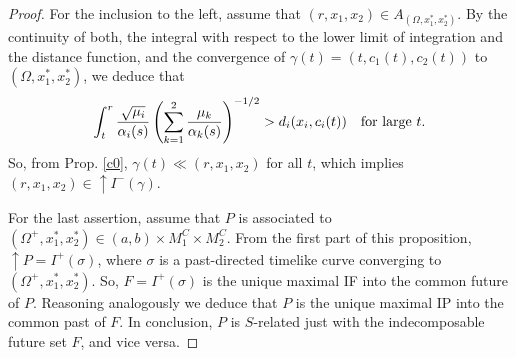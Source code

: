 \begin{proof}
\smallskip

 For the inclusion to the left, assume that $(r,x_1,x_2) \in A_{(\Omega,x_1^*,x_2^*)}$. By the continuity of both, the integral with respect to the lower limit of integration and the distance function, and the convergence of $\gamma(t)=(t,c_1(t),c_2(t))$ to
$(\Omega,x_1^{*},x_2^*)$, we deduce that
\[
\int_{t}^{r}\frac{\sqrt{\mu_{i}}}{\alpha_i(s)}\left(\sum_{k=1}^2\frac{\mu_k}{\alpha_k(s)}\right)^{-1/2} > d_{i}(x_{i},c_{i}(t))\quad\hbox{for large $t$.}
\]
So, from Prop. \ref{c0}, $\gamma(t) \ll  (r,x_1,x_2)$ for  all $t$, which implies $(r,x_1,x_2) \in \uparrow I^{-}(\gamma)$.

\smallskip

For the last assertion, assume that $P$ is associated to $(\Omega^+,x^*_1,x^*_2)\in (a,b)\times M_1^C\times M_2^C$. From the first part of this proposition, $\uparrow P= I^+(\sigma)$, where $\sigma$ is a past-directed timelike curve converging to $(\Omega^+,x^*_1,x^*_2)$. So, $F=I^+(\sigma)$ is the unique maximal IF into the common future of $P$. Reasoning analogously we deduce that $P$ is the unique maximal IP into the common past of $F$. In conclusion, $P$ is $S$-related just with the indecomposable future set $F$, and vice versa.
\end{proof}






